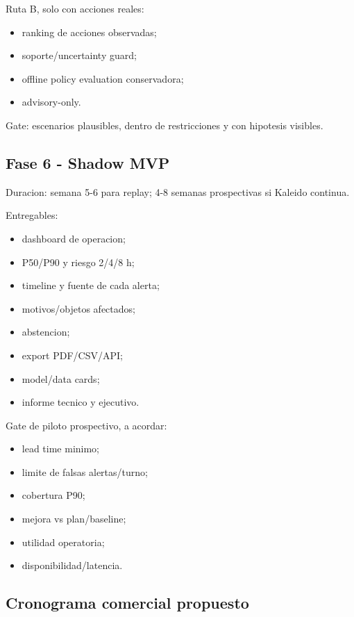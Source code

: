 \documentclass[
  spanish,
  10pt,
  a4paper,
]{article}
\providecommand{\tightlist}{%
  \setlength{\itemsep}{0pt}\setlength{\parskip}{0pt}}
\begin{document}
Ruta B, solo con acciones reales:

\begin{itemize}
\tightlist
\item
  ranking de acciones observadas;
\item
  soporte/uncertainty guard;
\item
  offline policy evaluation conservadora;
\item
  advisory-only.
\end{itemize}

Gate: escenarios plausibles, dentro de restricciones y con hipotesis
visibles.

\subsection{Fase 6 - Shadow MVP}\label{fase-6---shadow-mvp}

Duracion: semana 5-6 para replay; 4-8 semanas prospectivas si Kaleido
continua.

Entregables:

\begin{itemize}
\tightlist
\item
  dashboard de operacion;
\item
  P50/P90 y riesgo 2/4/8 h;
\item
  timeline y fuente de cada alerta;
\item
  motivos/objetos afectados;
\item
  abstencion;
\item
  export PDF/CSV/API;
\item
  model/data cards;
\item
  informe tecnico y ejecutivo.
\end{itemize}

Gate de piloto prospectivo, a acordar:

\begin{itemize}
\tightlist
\item
  lead time minimo;
\item
  limite de falsas alertas/turno;
\item
  cobertura P90;
\item
  mejora vs plan/baseline;
\item
  utilidad operatoria;
\item
  disponibilidad/latencia.
\end{itemize}

\subsection{Cronograma comercial
propuesto}\label{cronograma-comercial-propuesto}
\end{document}
